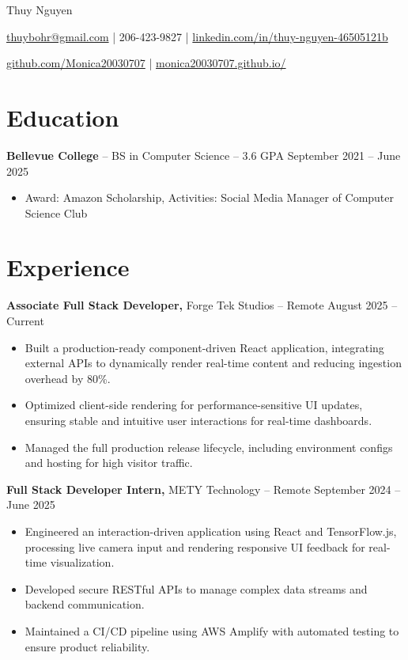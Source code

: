 \documentclass[11pt]{article}
\begin{document}
\centerline{\Huge Thuy Nguyen}
\vspace{5pt}
\centerline{\href{mailto:thuybohr@gmail.com}{thuybohr@gmail.com} | 206-423-9827 | \href{https://www.linkedin.com/in/thuy-nguyen-46505121b/}{linkedin.com/in/thuy-nguyen-46505121b}}
\centerline{\href{https://github.com/Monica20030707}{github.com/Monica20030707} | \href{https://monica20030707.github.io/}{monica20030707.github.io/}}

\vspace{-9pt}
\section*{Education}
\textbf{Bellevue College} -- BS in Computer Science -- 3.6 GPA \hfill September 2021 -- June 2025\\
\vspace{-9pt}
\begin{itemize}
  \item Award: Amazon Scholarship, Activities: Social Media Manager of Computer Science Club
\end{itemize}

\vspace{-18.5pt}
\section*{Experience}

\textbf{Associate Full Stack Developer,} {Forge Tek Studios} -- Remote \hfill August 2025 -- Current
\vspace{-9pt}
\begin{itemize}
  \item Built a production-ready component-driven React application, integrating external APIs to dynamically render real-time content and reducing ingestion overhead by 80\%.
  \item Optimized client-side rendering for performance-sensitive UI updates, ensuring stable and intuitive user interactions for real-time dashboards.
  \item Managed the full production release lifecycle, including environment configs and hosting for high visitor traffic.
\end{itemize}

\textbf{Full Stack Developer Intern,} {METY Technology} -- Remote \hfill September 2024 -- June 2025
\vspace{-9pt}
\begin{itemize}
  \item Engineered an interaction-driven application using React and TensorFlow.js, processing live camera input and rendering responsive UI feedback for real-time visualization.
  \item Developed secure RESTful APIs to manage complex data streams and backend communication.
  \item Maintained a CI/CD pipeline using AWS Amplify with automated testing to ensure product reliability.
\end{itemize}
\end{document}
